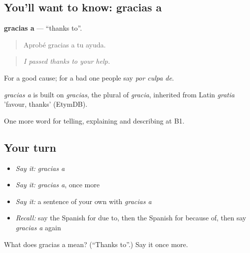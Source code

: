 \subsection*{You'll want to know: gracias a}
\textbf{gracias a} — \textquotedblleft{}thanks to\textquotedblright{}.

\begin{quote}
Aprobé gracias a tu ayuda.
\end{quote}

\begin{quote}
\emph{I passed thanks to your help.}
\end{quote}

For a good cause; for a bad one people say \emph{por culpa de}.

\begin{cousinweb}
\emph{gracias a} is built on \emph{gracias}, the plural of \emph{gracia}, inherited from Latin \emph{gratia} 'favour, thanks' (EtymDB).
\end{cousinweb}

\begin{grammarlens}[title={What you've built}]
One more word for telling, explaining and describing at B1.
\end{grammarlens}

\subsection*{Your turn}
\begin{itemize}
\raggedright
  \item \emph{Say it:} \emph{gracias a}
  \item \emph{Say it:} \emph{gracias a}, once more
  \item \emph{Say it:} a sentence of your own with \emph{gracias a}
  \item \emph{Recall:} say the Spanish for due to, then the Spanish for because of, then say \emph{gracias a} again
\end{itemize}

\begin{tcolorbox}[breakable,colback=teal!4,colframe=teal!35!black,title={Before you move on}]
What does gracias a mean? (\textquotedblleft{}Thanks to\textquotedblright{}.) Say it once more.
\end{tcolorbox}
